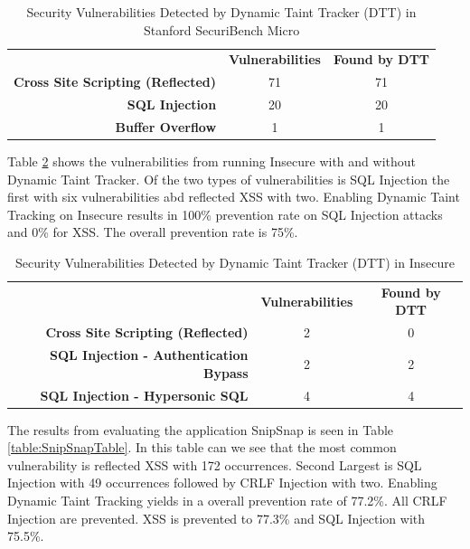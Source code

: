 \begin{table}[!hbt]
  \centering
  \caption{Security Vulnerabilities Detected by Dynamic Taint Tracker (DTT) in Stanford SecuriBench Micro}
  \label{table:MicroTable}
    \begin{tabular}{rcc}
      & \textbf{Vulnerabilities} & \textbf{Found by DTT} \\
      \textbf{Cross Site Scripting (Reflected)} & 71            & 71  \\
      \textbf{SQL Injection}                    & 20            & 20  \\
      \textbf{Buffer Overflow}                  & 1             & 1  
    \end{tabular}
\end{table}

Table \ref{table:InsecureTable} shows the vulnerabilities from running Insecure \parencite{insecure} with and without Dynamic Taint Tracker. Of the two types of vulnerabilities is SQL Injection the first with six vulnerabilities abd reflected XSS with two. Enabling Dynamic Taint Tracking on Insecure \parencite{insecure} results in 100\% prevention rate on SQL Injection attacks and 0\% for XSS. The overall prevention rate is 75\%. 

\begin{table}[!hbt]
  \centering
  \caption{Security Vulnerabilities Detected by Dynamic Taint Tracker (DTT) in Insecure}
  \label{table:InsecureTable}
    \begin{tabular}{rcc}
      & \textbf{Vulnerabilities} & \textbf{Found by DTT} \\
      \textbf{Cross Site Scripting (Reflected)}      & 2             & 0  \\
      \textbf{SQL Injection - Authentication Bypass} & 2             & 2  \\
      \textbf{SQL Injection - Hypersonic SQL}        & 4             & 4  
    \end{tabular}
\end{table}

The results from evaluating the application SnipSnap \parencite{snipsnap} is seen in Table \ref{table:SnipSnapTable}. In this table can we see that the most common vulnerability is reflected XSS with 172 occurrences. Second Largest is SQL Injection with 49 occurrences followed by CRLF Injection with two. Enabling Dynamic Taint Tracking yields in a overall prevention rate of 77.2\%. All CRLF Injection are prevented. XSS is prevented to 77.3\% and SQL Injection with 75.5\%.

